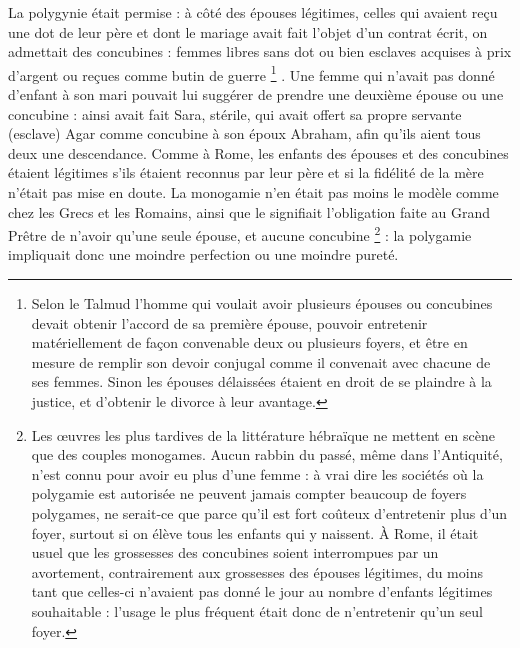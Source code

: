  La polygynie était permise : à côté des épouses légitimes, celles qui avaient reçu une dot de leur père et dont le mariage avait fait l'objet d'un contrat écrit, on admettait des concubines : femmes libres sans dot ou bien esclaves acquises à prix d'argent ou reçues comme butin de guerre%
\footnote{Selon le Talmud l'homme qui voulait avoir plusieurs épouses ou concubines devait obtenir l'accord de sa première épouse, pouvoir entretenir matériellement de façon convenable deux ou plusieurs foyers, et être en mesure de remplir son devoir conjugal comme il convenait avec chacune de ses femmes. Sinon les épouses délaissées étaient en droit de se plaindre à la justice, et d'obtenir le divorce à leur avantage.}%
. Une femme qui n'avait pas donné d'enfant à son mari pouvait lui suggérer de prendre une deuxième épouse ou une concubine : ainsi avait fait Sara, stérile, qui avait offert sa propre servante (esclave) Agar comme concubine à son époux Abraham, afin qu'ils aient tous deux une descendance. Comme à Rome, les enfants des épouses et des concubines étaient légitimes s'ils étaient reconnus par leur père et si la fidélité de la mère n'était pas mise en doute. La monogamie n'en était pas moins le modèle comme chez les Grecs et les Romains, ainsi que le signifiait l'obligation faite au Grand Prêtre de n'avoir qu'une seule épouse, et aucune concubine%
\footnote{Les œuvres les plus tardives de la littérature hébraïque ne mettent en scène que des couples monogames. Aucun rabbin du passé, même dans l'Antiquité, n'est connu pour avoir eu plus d'une femme : à vrai dire les sociétés où la polygamie est autorisée ne peuvent jamais compter beaucoup de foyers polygames, ne serait-ce que parce qu'il est fort coûteux d'entretenir plus d'un foyer, surtout si on élève tous les enfants qui y naissent. À Rome, il était usuel que les grossesses des concubines soient interrompues par un avortement, contrairement aux grossesses des épouses légitimes, du moins tant que celles-ci n'avaient pas donné le jour au nombre d'enfants légitimes souhaitable : l'usage le plus fréquent était donc de n'entretenir qu'un seul foyer.}%
 : la polygamie impliquait donc une moindre perfection ou une moindre pureté.

